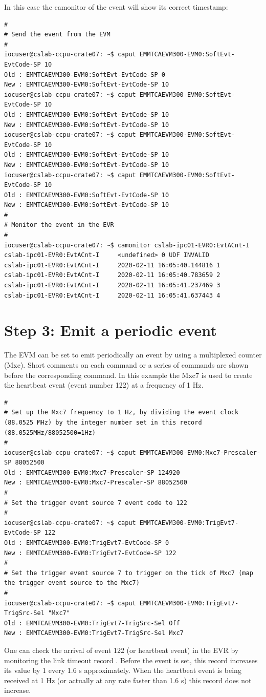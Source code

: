\documentclass[11pt
  , a4paper
  , article
  , oneside
  , showtrims
]{memoir}
\begin{document}
In this case the camonitor of the event will show its correct timestamp:
\begin{lstlisting}[style=termstyle]
#
# Send the event from the EVM
#
iocuser@cslab-ccpu-crate07: ~$ caput EMMTCAEVM300-EVM0:SoftEvt-EvtCode-SP 10
Old : EMMTCAEVM300-EVM0:SoftEvt-EvtCode-SP 0
New : EMMTCAEVM300-EVM0:SoftEvt-EvtCode-SP 10
iocuser@cslab-ccpu-crate07: ~$ caput EMMTCAEVM300-EVM0:SoftEvt-EvtCode-SP 10
Old : EMMTCAEVM300-EVM0:SoftEvt-EvtCode-SP 10
New : EMMTCAEVM300-EVM0:SoftEvt-EvtCode-SP 10
iocuser@cslab-ccpu-crate07: ~$ caput EMMTCAEVM300-EVM0:SoftEvt-EvtCode-SP 10
Old : EMMTCAEVM300-EVM0:SoftEvt-EvtCode-SP 10
New : EMMTCAEVM300-EVM0:SoftEvt-EvtCode-SP 10
iocuser@cslab-ccpu-crate07: ~$ caput EMMTCAEVM300-EVM0:SoftEvt-EvtCode-SP 10
Old : EMMTCAEVM300-EVM0:SoftEvt-EvtCode-SP 10
New : EMMTCAEVM300-EVM0:SoftEvt-EvtCode-SP 10
#
# Monitor the event in the EVR
#
iocuser@cslab-ccpu-crate07: ~$ camonitor cslab-ipc01-EVR0:EvtACnt-I
cslab-ipc01-EVR0:EvtACnt-I     <undefined> 0 UDF INVALID
cslab-ipc01-EVR0:EvtACnt-I     2020-02-11 16:05:40.144816 1
cslab-ipc01-EVR0:EvtACnt-I     2020-02-11 16:05:40.783659 2
cslab-ipc01-EVR0:EvtACnt-I     2020-02-11 16:05:41.237469 3
cslab-ipc01-EVR0:EvtACnt-I     2020-02-11 16:05:41.637443 4
\end{lstlisting}


\section{Step 3: Emit a periodic event}
The EVM can be set to emit periodically an event by using a multiplexed counter (Mxc). Short comments on each command or a series of commands are shown before the corresponding command. In this example the Mxc7 is used to create the heartbeat event (event number 122) at a frequency of 1 Hz.
\begin{lstlisting}[style=termstyle]
#
# Set up the Mxc7 frequency to 1 Hz, by dividing the event clock (88.0525 MHz) by the integer number set in this record (88.0525MHz/88052500=1Hz)
#
iocuser@cslab-ccpu-crate07: ~$ caput EMMTCAEVM300-EVM0:Mxc7-Prescaler-SP 88052500
Old : EMMTCAEVM300-EVM0:Mxc7-Prescaler-SP 124920
New : EMMTCAEVM300-EVM0:Mxc7-Prescaler-SP 88052500
#
# Set the trigger event source 7 event code to 122
#
iocuser@cslab-ccpu-crate07: ~$ caput EMMTCAEVM300-EVM0:TrigEvt7-EvtCode-SP 122
Old : EMMTCAEVM300-EVM0:TrigEvt7-EvtCode-SP 0
New : EMMTCAEVM300-EVM0:TrigEvt7-EvtCode-SP 122
#
# Set the trigger event source 7 to trigger on the tick of Mxc7 (map the trigger event source to the Mxc7)
#
iocuser@cslab-ccpu-crate07: ~$ caput EMMTCAEVM300-EVM0:TrigEvt7-TrigSrc-Sel "Mxc7"
Old : EMMTCAEVM300-EVM0:TrigEvt7-TrigSrc-Sel Off
New : EMMTCAEVM300-EVM0:TrigEvt7-TrigSrc-Sel Mxc7
\end{lstlisting}
One can check the arrival of event 122 (or heartbeat event) in the EVR by monitoring the link timeout record . Before the event is set, this record increases its value by 1 every 1.6 s approximately. When the heartbeat event is being received at 1 Hz (or actually at any rate faster than 1.6 s) this record does not increase.\\
\end{document}
